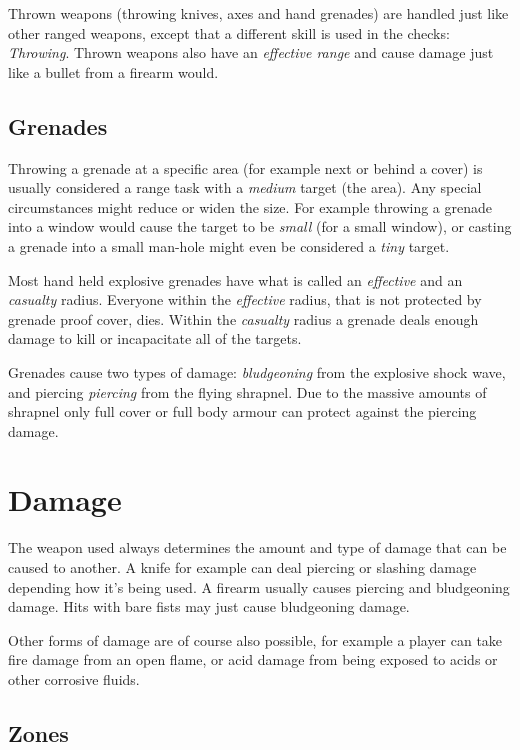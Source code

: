 Thrown weapons (throwing knives, axes and hand grenades) are handled just like
other ranged weapons, except that a different skill is used in the checks:
\emph{Throwing}. Thrown weapons also have an \emph{effective range} and cause
damage just like a bullet from a firearm would.

\subsection{Grenades}
\label{sub:7-Grenades}

Throwing a grenade at a specific area (for example next or behind a cover) is
usually considered a range task with a \emph{medium} target (the area). Any
special circumstances might reduce or widen the size. For example throwing a
grenade into a window would cause the target to be \emph{small} (for a small
window), or casting a grenade into a small man-hole might even be considered
a \emph{tiny} target.

Most hand held explosive grenades have what is called an \emph{effective} and
an \emph{casualty} radius. Everyone within the \emph{effective} radius, that is
not protected by grenade proof cover, dies. Within the \emph{casualty} radius
a grenade deals enough damage to kill or incapacitate all of the targets.

Grenades cause two types of damage: \emph{bludgeoning} from the explosive shock
wave, and piercing \emph{piercing} from the flying shrapnel. Due to the massive
amounts of shrapnel only full cover or full body armour can protect against the
piercing damage.

\section{Damage}
\label{sec:7-Damage}

The weapon used always determines the amount and type of damage that can be
caused to another. A knife for example can deal piercing or slashing damage
depending how it's being used. A firearm usually causes piercing and
bludgeoning damage. Hits with bare fists may just cause bludgeoning damage.

Other forms of damage are of course also possible, for example a player can
take fire damage from an open flame, or acid damage from being exposed to
acids or other corrosive fluids.

\subsection{Zones}
\label{sub:7-Zones}

